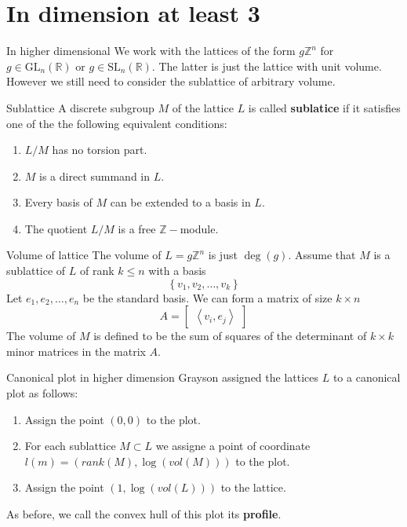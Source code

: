 \documentclass[pdf]{beamer}
\begin{document}
\section{In dimension at least 3}
\begin{frame}{In higher dimensional}
    We work with the lattices of the form $g\mathbb{Z}^n$ for $g \in \text{GL}_n(\mathbb{R})$ or
    $g \in \text{SL}_n(\mathbb{R})$. The latter is just the lattice with unit volume. However
    we still need to consider the sublattice of arbitrary volume.
    \pause
    \begin{block}{Sublattice}
        A discrete subgroup $M$ of the lattice $L$ is called \textbf{sublatice} if it satisfies one of the
        the following equivalent conditions:
        \begin{enumerate}
            \item $L/M$ has no torsion part.
            \item $M$ is a direct summand in $L$.
            \item Every basis of $M$ can be extended to a basis in $L$.
            \item The quotient $L/M$ is a free $\mathbb{Z}-$module.
        \end{enumerate}
    \end{block}
\end{frame}
\begin{frame}{Volume of lattice}
    The volume of $L = g\mathbb{Z}^n$ is just $\deg(g)$. Assume that $M$ is a sublattice of $L$ of rank $k \le n$
    with a basis
    \[\left\lbrace v_1, v_2,\ldots, v_k\right\rbrace\]
    Let $e_1,e_2,\ldots,e_n$ be the standard basis. We can form a matrix of size $k \times n$
    \[A = \begin{bmatrix}
            \left\langle v_i ,e_j\right\rangle
        \end{bmatrix}\]
    The volume of $M$ is defined to be the sum of squares of the determinant of $k \times k$ minor matrices in the matrix $A$.
\end{frame}
\begin{frame}{Canonical plot in higher dimension}
    Grayson assigned the lattices $L$ to a canonical plot as follows:
    \begin{enumerate}
        \item Assign the point $(0,0)$ to the plot.
        \item For each sublattice $M \subset L$ we assigne a point of coordinate ${l}(m) =(rank(M),\log(vol(M)))$ to the plot.
        \item Assign the point $(1,\log(vol(L)))$ to the lattice.
    \end{enumerate} \pause

    As before, we call the convex hull of this plot its \textbf{profile}.
\end{frame}
\end{document}
